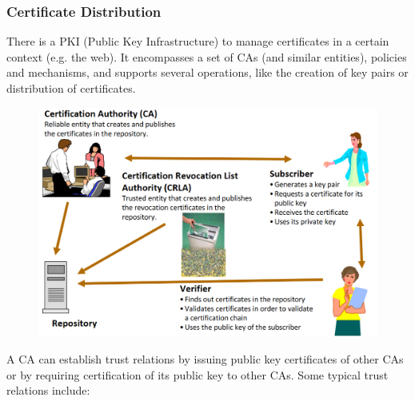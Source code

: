 \documentclass[10pt,a4paper]{report}
\begin{document}
\subsubsection{Certificate Distribution}
There is a PKI (Public Key Infrastructure) to manage certificates in a certain context (e.g. the web). It encompasses a set of CAs (and similar entities), policies and mechanisms, and supports several operations, like the creation of key pairs or distribution of certificates.
\begin{figure}[H]
\centering
\includegraphics[scale=0.40]{23.png}
\end{figure}
A CA can establish trust relations by issuing public key certificates of other CAs or by requiring certification of its public key to other CAs. Some typical trust relations include:
\end{document}
